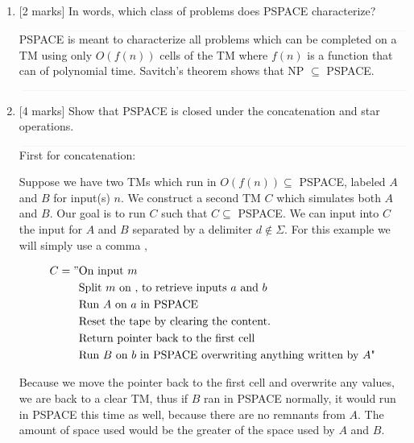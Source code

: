 \documentclass{article}
\begin{document}
\begin{enumerate}
    \item {[2 marks]} In words, which class of problems does PSPACE characterize?

            $\textcolor[RGB]{220,220,220}{\rule{\linewidth}{0.2pt}}$
            PSPACE is meant to characterize all problems which can be completed on a TM using only $O(f(n))$ cells of the TM where $f(n)$ is a function that can of polynomial time. Savitch’s theorem shows that NP $\subseteq$ PSPACE.

            $\textcolor[RGB]{220,220,220}{\rule{\linewidth}{0.2pt}}$

    \item {[4 marks]} Show that PSPACE is closed under the concatenation and star operations.

            $\textcolor[RGB]{220,220,220}{\rule{\linewidth}{0.2pt}}$
            First for concatenation:

            Suppose we have two TMs which run in $O(f(n)) \subseteq$ PSPACE, labeled $A$ and $B$ for input(s) $n$. We construct a second TM $C$ which simulates both $A$  and $B$. Our goal is to run $C$ such that $C \subseteq$ PSPACE. We can input into $C$ the input for $A$ and $B$ separated by a delimiter $d \not\in \Sigma$. For this example we will simply use a comma $,$

            \begin{equation}
            	\begin{split}
            		C = "& \text{On input $m$} \\
            			 & \text{Split $m$ on $,$ to retrieve inputs $a$ and $b$} \\
            			 & \text{Run $A$ on $a$ in PSPACE} \\
                         & \text{Reset the tape by clearing the content.} \\
            			 & \text{Return pointer back to the first cell} \\
                         & \text{Run $B$ on $b$ in PSPACE overwriting anything written by $A$"}
            	\end{split}
            \end{equation}

            Because we move the pointer back to the first cell and overwrite any values, we are back to a clear TM, thus if $B$ ran in PSPACE normally, it would run in PSPACE this time as well, because there are no remnants from $A$. The amount of space used would be the greater of the space used by $A$ and $B$.


\end{enumerate}
\end{document}
